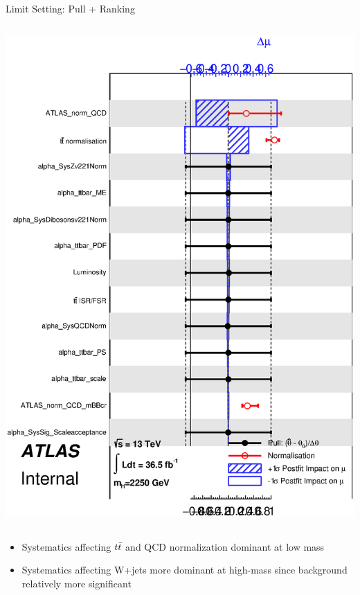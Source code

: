 \documentclass{beamer}
\newcommand*{\ttbar}{\ensuremath{\lowercase{t\bar{t}}}\xspace}
\begin{document}
{\begin{frame}{Limit Setting: Pull + Ranking}
\begin{columns}
      \includegraphics[width=\textwidth]{../chapters/dihiggs2/figures/statFit/pullPlot_X2250_mu0_unconditional.eps} 
    \end{columns}
    \vspace{-13pt}

    \begin{itemize}\footnotesize
    \item Systematics affecting \ttbar and QCD normalization dominant at low mass
    \item Systematics affecting W+jets more dominant at high-mass since background relatively more significant
    \end{itemize}
  \end{frame}

}
\end{document}

